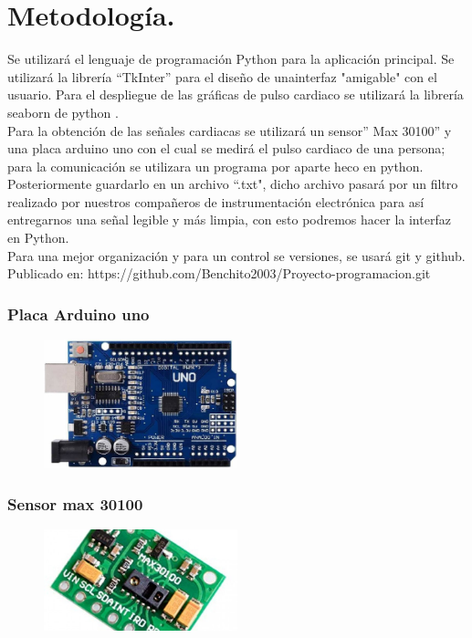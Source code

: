 \documentclass{report}
\begin{document}
	\section{Metodología.}
	Se utilizará el lenguaje de programación Python \cite{python3} para la aplicación principal. Se utilizará la librería “TkInter”\cite{tkinter} para el diseño de unainterfaz "amigable" con el usuario. Para el despliegue de las gráficas de pulso cardiaco se utilizará la librería seaborn de python \cite{Seaborn}.\\
	Para la obtención de las señales cardiacas se utilizará un sensor” Max 30100” y una placa arduino uno con el cual se medirá el pulso cardiaco de una persona; para la comunicación se utilizara un programa por aparte heco en python. Posteriormente guardarlo en un archivo “.txt", dicho archivo pasará por un filtro realizado por nuestros compañeros de instrumentación electrónica para así entregarnos una señal legible y más limpia, con esto podremos hacer la interfaz en Python.\\
	Para una mejor organización y para un control se versiones, se usará git y github. Publicado en: https://github.com/Benchito2003/Proyecto-programacion.git
	
	\subsubsection{Placa Arduino uno}
	\begin{figure}[h]
		\includegraphics[width=0.5\textwidth]{recursos/placa-arduino} 
	\end{figure}
	
	\subsubsection{Sensor max 30100}
	\begin{figure}[h]
		\includegraphics[width=0.5\textwidth]{recursos/imagen}
	\end{figure}
	
	
	\printbibliography
\end{document}
